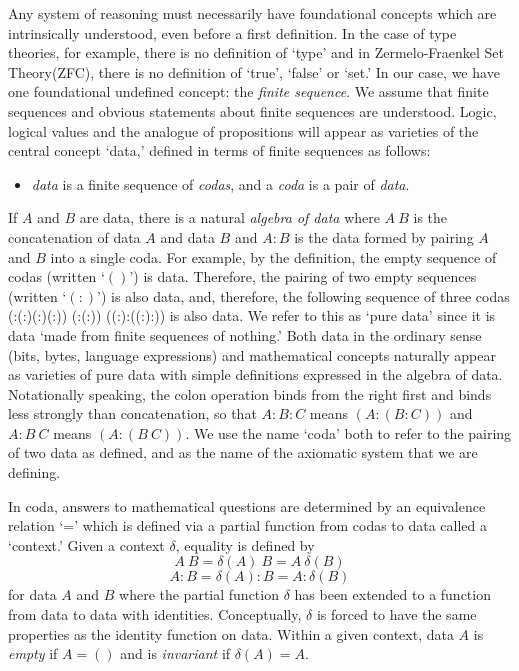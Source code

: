 \documentclass[11pt]{article}
\begin{document}
     Any system of reasoning must necessarily have foundational concepts which are intrinsically understood, even before a first definition.
In the case of type theories\cite{Type,Type2,HOTT,aldor}, for example, there is no definition of `type' and in Zermelo-Fraenkel Set Theory(ZFC\cite{ZFC}), there is no definition of `true', `false' or `set.'
In our case, we have one foundational undefined concept:
the {\it finite sequence}.  We assume that finite sequences and obvious statements about finite sequences are understood.  Logic,
logical values and the analogue of propositions will appear as varieties of the central concept  `data,' defined in terms
of finite sequences as follows:
\begin{itemize}
\item {\it data} is a finite sequence of {\it codas}, and a {\it coda} is a pair of {\it data}.
\end{itemize}
If $A$ and $B$ are data, there is a natural {\it algebra of data} where $A\ B$ is the concatenation of data $A$ and data $B$ and $A:B$ is
the data formed by pairing $A$ and $B$ into a single coda.  For example, by the definition, the empty sequence of codas (written `$()$') is data.  Therefore,
the pairing of two empty sequences (written `$(:)$') is also data, and, therefore, the following sequence of three codas (:(:)(:)(:)) (:(:)) ((:):((:):)) is also data.
We refer to this as `pure data' since it is data `made from finite sequences of nothing.'
Both data in the ordinary sense (bits, bytes, language expressions) and mathematical concepts naturally appear as varieties
of pure data with simple definitions expressed in the algebra of data.  Notationally speaking, the colon operation binds from the right first and binds
less strongly than concatenation, so that $A:B:C$ means $(A:(B:C))$ and $A:B\ C$ means $(A:(B\ C))$.  We use the name `coda' both to refer 
to the pairing of two data as defined, and as the name of the axiomatic system that we are defining\cite{github}.

     In coda, answers to mathematical questions are determined by an equivalence relation `=' which is defined via a partial function from codas to data
called a `context.'  Given a context $\delta$, equality is defined by
\begin{equation}
	A\ B = \delta(A)\ B = A\ \delta(B)
\end{equation}
\begin{equation}
	A:B = \delta(A):B = A:\delta(B)
\end{equation}
for data $A$ and $B$ where the partial function $\delta$ has been extended to a function from data to data with identities.
Conceptually, $\delta$ is forced to have the same properties as the identity function on data.  Within a given context,
data $A$ is {\it empty} if $A=()$ and is {\it invariant} if $\delta(A)=A$.
\end{document}
